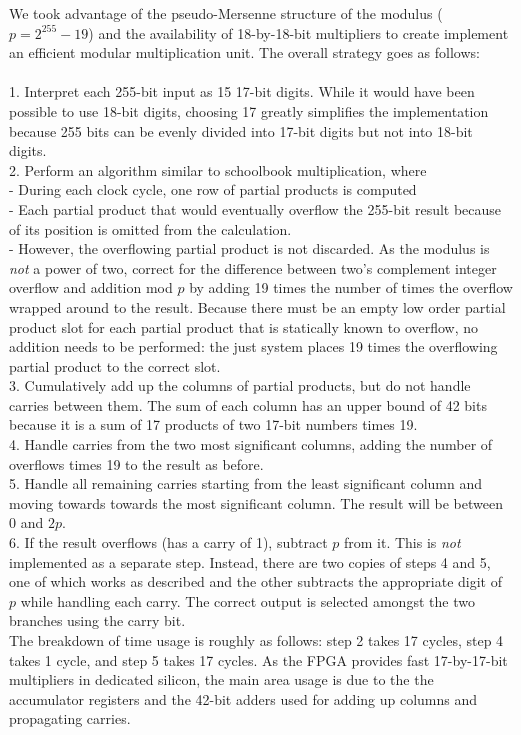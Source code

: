 \documentclass[a4paper]{report}
\begin{document}
We took advantage of the pseudo-Mersenne structure of the modulus
($p=2^{255}-19$) and the availability of 18-by-18-bit multipliers to create
implement an efficient modular multiplication unit. The overall strategy goes as
follows: \\ \\
1. Interpret each 255-bit input as 15 17-bit digits. While it would have been
possible to use 18-bit digits, choosing 17 greatly simplifies the implementation
because 255 bits can be evenly divided into 17-bit digits but not into 18-bit
digits. \\
2. Perform an algorithm similar to schoolbook multiplication, where \\
- During each clock cycle, one row of partial products is computed \\
- Each partial product that would eventually overflow the 255-bit result
because of its position is omitted from the calculation. \\
- However, the overflowing partial product is not discarded. As the modulus
is \emph{not} a power of two, correct for the difference between two's
complement integer overflow and addition mod $p$ by adding 19 times the number
of times the overflow wrapped around to the result. Because there must be an
empty low order partial product slot for each partial product that is statically
known to overflow, no addition needs to be performed: the just system places 19
times the overflowing partial product to the correct slot. \\
3. Cumulatively add up the columns of partial products, but do not handle
carries between them. The sum of each column has an upper bound of 42 bits
because it is a sum of 17 products of two 17-bit numbers times 19. \\
4. Handle carries from the two most significant columns, adding the number of
overflows times 19 to the result as before. \\
5. Handle all remaining carries starting from the least significant column and
moving towards towards the most significant column. The result will be
between $0$ and $2p$. \\
6. If the result overflows (has a carry of 1), subtract $p$ from it. This is \emph{not}  implemented as a
separate step. Instead, there are two copies of steps 4 and 5, one of which
works as described and the other subtracts the appropriate digit of $p$ while
handling each carry. The correct output is selected amongst the two branches
using the carry bit. \\

The breakdown of time usage is roughly as follows: step 2 takes 17 cycles, step
4 takes 1 cycle, and step 5 takes 17 cycles. As the FPGA provides fast
17-by-17-bit multipliers in dedicated silicon, the main area usage is due to the
the accumulator registers and the 42-bit adders used for adding up columns and
propagating carries.
\end{document}
